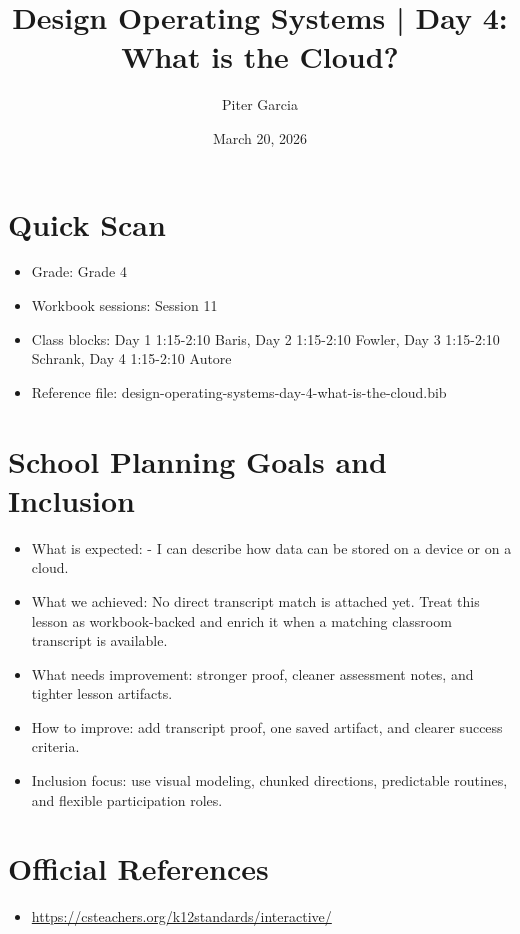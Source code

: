 \documentclass[11pt]{article}
\title{Design Operating Systems | Day 4: What is the Cloud?}
\author{Piter Garcia}
\date{March 20, 2026}
\begin{document}
\maketitle
\section*{Quick Scan}
\begin{itemize}[leftmargin=*]
\item Grade: Grade 4
\item Workbook sessions: Session 11
\item Class blocks: Day 1 1:15-2:10 Baris, Day 2 1:15-2:10 Fowler, Day 3 1:15-2:10 Schrank, Day 4 1:15-2:10 Autore
\item Reference file: design-operating-systems-day-4-what-is-the-cloud.bib
\end{itemize}
\section*{School Planning Goals and Inclusion}
\begin{itemize}[leftmargin=*]
\item What is expected: - I can describe how data can be stored on a device or on a cloud.
\item What we achieved: No direct transcript match is attached yet. Treat this lesson as workbook-backed and enrich it when a matching classroom transcript is available.
\item What needs improvement: stronger proof, cleaner assessment notes, and tighter lesson artifacts.
\item How to improve: add transcript proof, one saved artifact, and clearer success criteria.
\item Inclusion focus: use visual modeling, chunked directions, predictable routines, and flexible participation roles.
\end{itemize}
\section*{Official References}
\begin{itemize}[leftmargin=*]
\item \url{https://csteachers.org/k12standards/interactive/}

\end{itemize}
\end{document}
